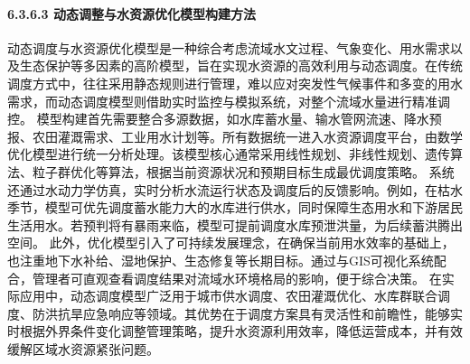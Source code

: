 \paragraph{6.3.6.3
动态调整与水资源优化模型构建方法}\label{ux52a8ux6001ux8c03ux6574ux4e0eux6c34ux8d44ux6e90ux4f18ux5316ux6a21ux578bux6784ux5efaux65b9ux6cd5}
动态调度与水资源优化模型是一种综合考虑流域水文过程、气象变化、用水需求以及生态保护等多因素的高阶模型，旨在实现水资源的高效利用与动态调度。在传统调度方式中，往往采用静态规则进行管理，难以应对突发性气候事件和多变的用水需求，而动态调度模型则借助实时监控与模拟系统，对整个流域水量进行精准调控。
模型构建首先需要整合多源数据，如水库蓄水量、输水管网流速、降水预报、农田灌溉需求、工业用水计划等。所有数据统一进入水资源调度平台，由数学优化模型进行统一分析处理。该模型核心通常采用线性规划、非线性规划、遗传算法、粒子群优化等算法，根据当前资源状况和预期目标生成最优调度策略。
系统还通过水动力学仿真，实时分析水流运行状态及调度后的反馈影响。例如，在枯水季节，模型可优先调度蓄水能力大的水库进行供水，同时保障生态用水和下游居民生活用水。若预判将有暴雨来临，模型可提前调度水库预泄洪量，为后续蓄洪腾出空间。
此外，优化模型引入了可持续发展理念，在确保当前用水效率的基础上，也注重地下水补给、湿地保护、生态修复等长期目标。通过与GIS可视化系统配合，管理者可直观查看调度结果对流域水环境格局的影响，便于综合决策。
在实际应用中，动态调度模型广泛用于城市供水调度、农田灌溉优化、水库群联合调度、防洪抗旱应急响应等领域。其优势在于调度方案具有灵活性和前瞻性，能够实时根据外界条件变化调整管理策略，提升水资源利用效率，降低运营成本，并有效缓解区域水资源紧张问题。
